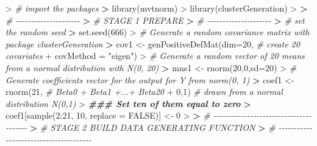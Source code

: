 \documentclass[
]{article}
\newenvironment{Shaded}{\begin{snugshade}}{\end{snugshade}}
\newcommand{\AttributeTok}[1]{\textcolor[rgb]{0.77,0.63,0.00}{#1}}
\newcommand{\CommentTok}[1]{\textcolor[rgb]{0.56,0.35,0.01}{\textit{#1}}}
\newcommand{\ConstantTok}[1]{\textcolor[rgb]{0.00,0.00,0.00}{#1}}
\newcommand{\DecValTok}[1]{\textcolor[rgb]{0.00,0.00,0.81}{#1}}
\newcommand{\DocumentationTok}[1]{\textcolor[rgb]{0.56,0.35,0.01}{\textbf{\textit{#1}}}}
\newcommand{\ErrorTok}[1]{\textcolor[rgb]{0.64,0.00,0.00}{\textbf{#1}}}
\newcommand{\FunctionTok}[1]{\textcolor[rgb]{0.00,0.00,0.00}{#1}}
\newcommand{\NormalTok}[1]{#1}
\newcommand{\OtherTok}[1]{\textcolor[rgb]{0.56,0.35,0.01}{#1}}
\newcommand{\SpecialCharTok}[1]{\textcolor[rgb]{0.00,0.00,0.00}{#1}}
\newcommand{\StringTok}[1]{\textcolor[rgb]{0.31,0.60,0.02}{#1}}
\begin{document}
\begin{Shaded}
\begin{Highlighting}[]
\SpecialCharTok{\textgreater{}} \CommentTok{\# import the packages}
\ErrorTok{\textgreater{}} \FunctionTok{library}\NormalTok{(mvtnorm)}
\SpecialCharTok{\textgreater{}} \FunctionTok{library}\NormalTok{(clusterGeneration)}
\SpecialCharTok{\textgreater{}} 
\ErrorTok{\textgreater{}} \CommentTok{\# {-}{-}{-}{-}{-}{-}{-}{-}{-}{-}{-}{-}{-}{-}{-}{-}{-}{-}{-}{-}{-}}
\ErrorTok{\textgreater{}} \CommentTok{\# STAGE 1 PREPARE}
\ErrorTok{\textgreater{}} \CommentTok{\# {-}{-}{-}{-}{-}{-}{-}{-}{-}{-}{-}{-}{-}{-}{-}{-}{-}{-}{-}{-}{-}}
\ErrorTok{\textgreater{}} \CommentTok{\# set the random seed}
\ErrorTok{\textgreater{}} \FunctionTok{set.seed}\NormalTok{(}\DecValTok{666}\NormalTok{)}
\SpecialCharTok{\textgreater{}} \CommentTok{\# Generate a random covariance matrix with package clusterGeneration}
\ErrorTok{\textgreater{}}\NormalTok{ cov1 }\OtherTok{\textless{}{-}} \FunctionTok{genPositiveDefMat}\NormalTok{(}\AttributeTok{dim=}\DecValTok{20}\NormalTok{, }\CommentTok{\# create 20 covariates}
\SpecialCharTok{+}                           \AttributeTok{covMethod =} \StringTok{"eigen"}\NormalTok{)}
\SpecialCharTok{\textgreater{}} \CommentTok{\# Generate a random vector of 20 means from a normal distribution with N(0, 20)}
\ErrorTok{\textgreater{}}\NormalTok{ mns1 }\OtherTok{\textless{}{-}} \FunctionTok{rnorm}\NormalTok{(}\DecValTok{20}\NormalTok{,}\DecValTok{0}\NormalTok{,}\AttributeTok{sd=}\DecValTok{20}\NormalTok{)}
\SpecialCharTok{\textgreater{}} \CommentTok{\# Generate coefficients vector for the output for Y from norm(0, 1)  }
\ErrorTok{\textgreater{}}\NormalTok{ coef1 }\OtherTok{\textless{}{-}} \FunctionTok{rnorm}\NormalTok{(}\DecValTok{21}\NormalTok{, }\CommentTok{\# Beta0 + Beta1 +...+ Beta20}
\SpecialCharTok{+}                \DecValTok{0}\NormalTok{,}\DecValTok{1}\NormalTok{) }\CommentTok{\# drawn from a normal distribution N(0,1)}
\SpecialCharTok{\textgreater{}} \DocumentationTok{\#\#\# Set ten of them equal to zero}
\ErrorTok{\textgreater{}}\NormalTok{ coef1[}\FunctionTok{sample}\NormalTok{(}\DecValTok{2}\SpecialCharTok{:}\DecValTok{21}\NormalTok{, }\DecValTok{10}\NormalTok{, }\AttributeTok{replace =} \ConstantTok{FALSE}\NormalTok{)] }\OtherTok{\textless{}{-}} \DecValTok{0}
\SpecialCharTok{\textgreater{}} 
\ErrorTok{\textgreater{}} \CommentTok{\# {-}{-}{-}{-}{-}{-}{-}{-}{-}{-}{-}{-}{-}{-}{-}{-}{-}{-}{-}{-}{-}{-}{-}{-}{-}{-}{-}{-}{-}{-}{-}{-}{-}{-}{-}{-}{-}{-}{-}}
\ErrorTok{\textgreater{}} \CommentTok{\# STAGE 2 BUILD DATA GENERATING FUNCTION}
\ErrorTok{\textgreater{}} \CommentTok{\# {-}{-}{-}{-}{-}{-}{-}{-}{-}{-}{-}{-}{-}{-}{-}{-}{-}{-}{-}{-}{-}{-}{-}{-}{-}{-}{-}{-}{-}{-}{-}{-}{-}{-}{-}{-}{-}{-}{-}}

\end{Highlighting}
\end{Shaded}
\end{document}
